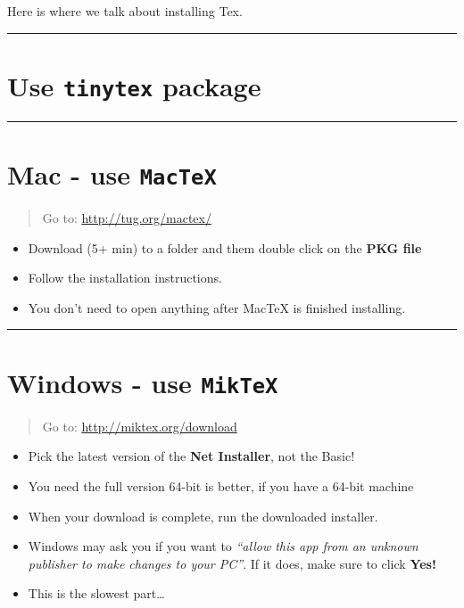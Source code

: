 \documentclass[]{book}
\providecommand{\tightlist}{%
  \setlength{\itemsep}{0pt}\setlength{\parskip}{0pt}}
\begin{document}
Here is where we talk about installing Tex.

\begin{center}\rule{0.5\linewidth}{\linethickness}\end{center}

\section{\texorpdfstring{Use \texttt{tinytex}
package}{Use tinytex package}}\label{use-tinytex-package}

\begin{center}\rule{0.5\linewidth}{\linethickness}\end{center}

\section{\texorpdfstring{Mac - use
\texttt{MacTeX}}{Mac - use MacTeX}}\label{mac---use-mactex}

\begin{quote}
Go to: \url{http://tug.org/mactex/}
\end{quote}

\begin{itemize}
\tightlist
\item
  Download (5+ min) to a folder and them double click on the \textbf{PKG
  file}
\item
  Follow the installation instructions.
\item
  You don't need to open anything after MacTeX is finished installing.
\end{itemize}

\begin{center}\rule{0.5\linewidth}{\linethickness}\end{center}

\section{\texorpdfstring{Windows - use
\texttt{MikTeX}}{Windows - use MikTeX}}\label{windows---use-miktex}

\begin{quote}
Go to: \url{http://miktex.org/download}
\end{quote}

\begin{itemize}
\tightlist
\item
  Pick the latest version of the \textbf{Net Installer}, not the Basic!
\item
  You need the full version 64-bit is better, if you have a 64-bit
  machine
\item
  When your download is complete, run the downloaded installer.
\item
  Windows may ask you if you want to \emph{``allow this app from an
  unknown publisher to make changes to your PC''}. If it does, make sure
  to click \textbf{Yes!}
\item
  This is the slowest part\ldots{}
\end{itemize}
\end{document}
